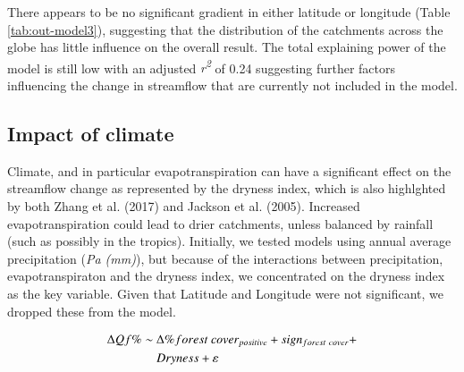 \documentclass[]{elsarticle} %
\begin{document}
There appears to be no significant gradient in either latitude or longitude (Table \ref{tab:out-model3}), suggesting that the distribution of the catchments across the globe has little influence on the overall result. The total explaining power of the model is still low with an adjusted \emph{r\textsuperscript{2}} of 0.24 suggesting further factors influencing the change in streamflow that are currently not included in the model.

\hypertarget{impact-of-climate}{%
\subsection{Impact of climate}\label{impact-of-climate}}

Climate, and in particular evapotranspiration can have a significant effect on the streamflow change as represented by the dryness index, which is also highlghted by both Zhang et al. (2017) and Jackson et al. (2005). Increased evapotranspiration could lead to drier catchments, unless balanced by rainfall (such as possibly in the tropics). Initially, we tested models using annual average precipitation (\emph{Pa (mm)}), but because of the interactions between precipitation, evapotranspiraton and the dryness index, we concentrated on the dryness index as the key variable. Given that Latitude and Longitude were not significant, we dropped these from the model.

\begin{align}
\Delta Qf \% \sim ~ & \Delta \% forest~cover_{positive} + sign_{forest~cover} + \notag \\ & Dryness + \varepsilon \label{eq:eq5}
\end{align}
\end{document}
